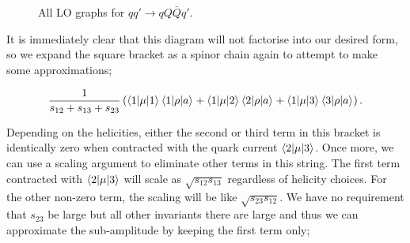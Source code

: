 \begin{figure}[H]
\caption{All LO graphs for $qq' \to qQ\bar{Q}q'$.}
\label{fig:qq_qQQq_graphs}
\end{figure}

It is immediately clear that this diagram will not factorise into our desired form, so we expand the square bracket as a spinor chain again to attempt to make some approximations;

\begin{equation}
\frac{1}{s_{12} + s_{13} + s_{23}} \left(\mathinner{\langle1\vert\mu\vert1\rangle}_{}\mathinner{\langle1\vert\rho\vert a\rangle}_{} + \mathinner{\langle1\vert\mu\vert2\rangle}_{} \mathinner{\langle2\vert\rho\vert a\rangle}_{} + \mathinner{\langle1\vert\mu\vert3\rangle}_{} \mathinner{\langle3\vert\rho\vert a\rangle}_{} \right).
\end{equation}

Depending on the helicities, either the second or third term in this bracket is identically zero when contracted with the quark current $\mathinner{\langle2\vert\mu\vert3\rangle}_{}$. Once more, we can use a scaling argument to eliminate other terms in this string. The first term contracted with $\mathinner{\langle2\vert\mu\vert3\rangle}_{}$ will scale as $\sqrt{s_{12} s_{13}}$ regardless of helicity choices. For the other non-zero term, the scaling will be like $\sqrt{s_{23} s_{12}}$. We have no requirement that $s_{23}$ be large but all other invariants there are large and thus we can approximate the sub-amplitude by keeping the first term only; 

